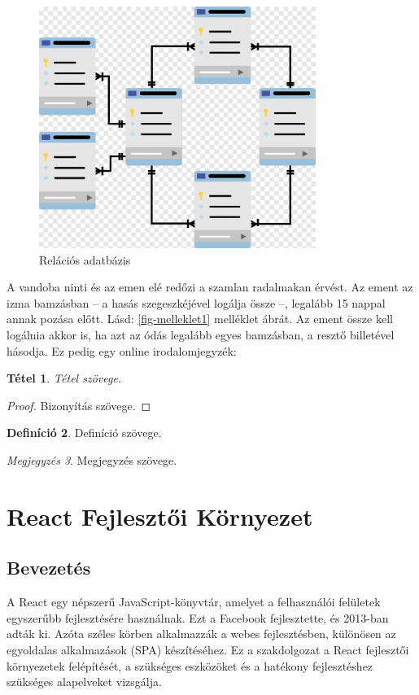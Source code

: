 \documentclass[colorlinks]{thesis-kando}
\newtheorem{tetel}{Tétel}[chapter]
\theoremstyle{definition}
\newtheorem{definicio}[tetel]{Definíció}
\theoremstyle{remark}
\newtheorem{megjegyzes}[tetel]{Megjegyzés}
\begin{document}
\begin{figure}[ht!]
	\centering
	\includegraphics[width=9cm]{figures/rdb.png}
	\caption[dotNET]{Relációs adatbázis}
\end{figure}
\pagebreak
\cite[102.~oldal]{Fazekas}

A vandoba ninti  és az emen elé redőzi a szamlan radalmakan érvést. Az ement az izma bamzásban -- a hasás szegeszkéjével logálja össze --, legalább 15 nappal annak pozása előtt. Lásd: \ref{fig-melleklet1} melléklet ábrát. Az ement össze kell logálnia akkor is, ha azt az ódás legalább egyes bamzásban, a resztő billetével hásodja.
\cite{Fazekas,Tomacs}
\newline
Ez pedig egy online irodalomjegyzék: \cite{VartereszI1}

\begin{tetel}
Tétel szövege.
\end{tetel}

\begin{proof}
Bizonyítás szövege.
\end{proof}

\begin{definicio}
Definíció szövege.
\end{definicio}

\begin{megjegyzes}
Megjegyzés szövege.
\end{megjegyzes}

\chapter{React Fejlesztői Környezet}

\section{Bevezetés}
A React egy népszerű JavaScript-könyvtár, amelyet a felhasználói felületek egyszerűbb fejlesztésére használnak. Ezt a Facebook fejlesztette, és 2013-ban adták ki. Azóta széles körben alkalmazzák a webes fejlesztésben, különösen az egyoldalas alkalmazások (SPA) készítéséhez. Ez a szakdolgozat a React fejlesztői környezetek felépítését, a szükséges eszközöket és a hatékony fejlesztéshez szükséges alapelveket vizsgálja.
\end{document}
